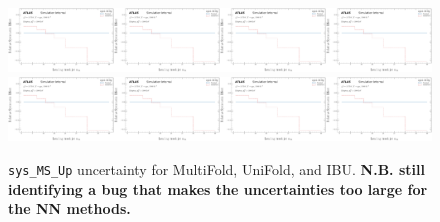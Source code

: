 \begin{figure}[h!]
\includegraphics[width=0.25\textwidth,page=131]{figures/SimResults/Lepton_SystEffect.pdf}\includegraphics[width=0.25\textwidth,page=139]{figures/SimResults/Lepton_SystEffect.pdf}\includegraphics[width=0.25\textwidth,page=147]{figures/SimResults/Lepton_SystEffect.pdf}\includegraphics[width=0.25\textwidth,page=155]{figures/SimResults/Lepton_SystEffect.pdf}\\
\includegraphics[width=0.25\textwidth,page=163]{figures/SimResults/Lepton_SystEffect.pdf}\includegraphics[width=0.25\textwidth,page=171]{figures/SimResults/Lepton_SystEffect.pdf}\includegraphics[width=0.25\textwidth,page=179]{figures/SimResults/Lepton_SystEffect.pdf}\includegraphics[width=0.25\textwidth,page=187]{figures/SimResults/Lepton_SystEffect.pdf}
\caption{\texttt{sys\_MS\_Up} uncertainty for MultiFold, UniFold, and IBU.  \textbf{N.B. still identifying a bug that makes the uncertainties too large for the NN methods.}}
\label{fig:simresultsmulti_Leptonuncertsl3}
\end{figure}

